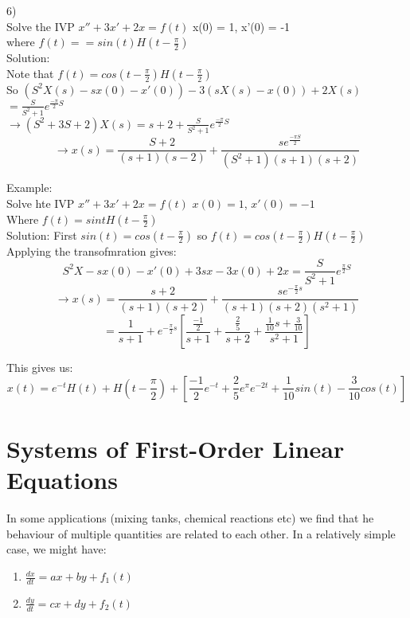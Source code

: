 \documentclass[12pt]{article}
\begin{document}
	6)\\
	Solve the IVP $x'' + 3x' + 2x = f(t)$ x(0) = 1, x'(0) = -1\\
	where $f(t) = = sin(t) H(t-\frac{\pi}{2})$\\
	Solution:\\
	Note that $f(t) = cos(t-\frac{\pi}{2})H(t-\frac{\pi}{2})$\\
	So $(S^2X(s) - sx(0) - x'(0)) - 3(sX(s) - x(0)) + 2X(s)$\\
	$= \frac{S}{S^2 + 1}e^{\frac{-\pi}{2}S}$\\
	$\rightarrow (S^2 + 3S + 2)X(s) = s + 2 + \frac{S}{S^2 + 1}e^{\frac{-\pi}{2}S}$\\
	$$\rightarrow x(s) = \frac{S+2}{(s+1)(s-2)} + \frac{se^{\frac{-\pi S}{2}}}{(S^2 + 1)(s+1)(s+2)}$$
	
	Example:\\
	Solve hte IVP $x'' + 3x' + 2x = f(t)$ $x(0) = 1$, $x'(0) = -1$\\
	Where $f(t) = sint H(t-\frac{\pi}{2})$\\
	
	Solution: First $sin(t) = cos(t - \frac{\pi}{2})$ so $f(t) = cos(t-\frac{\pi}{2})H(t-\frac{\pi}{2})$\\
	
	Applying the transofmration gives:\\
	$$S^2X - sx(0) - x'(0) + 3sx - 3x(0) + 2x = \frac{S}{S^2 + 1}e^{\frac{\pi}{2}S}$$
	$$\rightarrow x(s) = \frac{s+2}{(s+1)(s+2)} + \frac{se^{-\frac{\pi}{2}s}}{(s+1)(s+2)(s^2+1)}$$
	$$= \frac{1}{s+1} + e^{-\frac{\pi}{2}s}[\frac{\frac{-1}{2}}{s+1} + \frac{\frac{2}{5}}{s+2} + \frac{\frac{1}{10}s + \frac{3}{10}}{s^2 + 1}]$$
	
	This gives us:\\
	$$x(t) = e^{-t}H(t) + H(t-\frac{\pi}{2}) + [\frac{-1}{2}e^{-t} + \frac{2}{5}e^{\pi}e^{-2t} + \frac{1}{10}sin(t) - \frac{3}{10}cos(t)]$$
	
	\section*{Systems of First-Order Linear Equations}
	In some applications (mixing tanks, chemical reactions etc) we find that he behaviour of multiple quantities are related to each other. In a relatively simple case, we might have:\\
	\begin{enumerate}
		\item $\frac{dx}{dt} = ax + by + f_1(t)$
		\item $\frac{dy}{dt} = cx + dy + f_2(t)$
	\end{enumerate}
	
\end{document}
